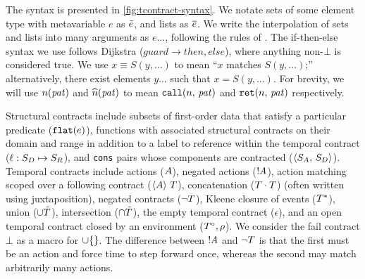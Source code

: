 %
The syntax is presented in \autoref{fig:tcontract-syntax}.
%
%
We notate sets of some element type with metavariable $e$ as $\tilde{e}$, and lists as $\overline{e}$.
%
We write the interpolation of sets and lists into many arguments as $e\ldots$, following the rules of \citet{dvanhorn:Kohlbecker1987Macrobyexample}.
%
The if-then-else syntax we use follows Dijkstra ($\mathit{guard} \to \mathit{then}, \mathit{else}$), where anything non-$\bot$ is considered true.
%
We use $x\equiv S(y,\ldots)$ to mean ``$x$ matches $S(y,\ldots)$;'' alternatively, there exist elements $y\ldots$ such that $x = S(y,\ldots)$.
%
For brevity, we will use $n(\mathit{pat})$ and $\widehat{n}(\mathit{pat})$ to mean ${\tt call}(n,\, \mathit{pat})$ and ${\tt ret}(n,\, \mathit{pat})$ respectively.

Structural contracts include subsets of first-order data that satisfy a particular predicate (${\tt flat}(e)$), functions with associated structural contracts on their domain and range in addition to a label to reference within the temporal contract ($\ell : S_D \mapsto S_R$), and {\tt cons} pairs whose components are contracted ($\langle S_A,\, S_D\rangle$).
Temporal contracts include actions ($A$), negated actions ($! A$), action matching scoped over a following contract ($\langle A\rangle\ T$), concatenation ($T \cdot T$) (often written using juxtaposition), negated contracts ($\neg T$), Kleene closure of events ($T^*$), union ($\cup \tilde{T}$), intersection ($\cap \tilde{T}$), the empty temporal contract ($\epsilon$), and an open temporal contract closed by an environment ($T^\circ, \rho$).
%
We consider the fail contract $\bot$ as a macro for $\cup \{\}$.
%
The difference between $! A$ and $\neg T$ is that the first must be an action and force time to step forward once, whereas the second may match arbitrarily many actions.

